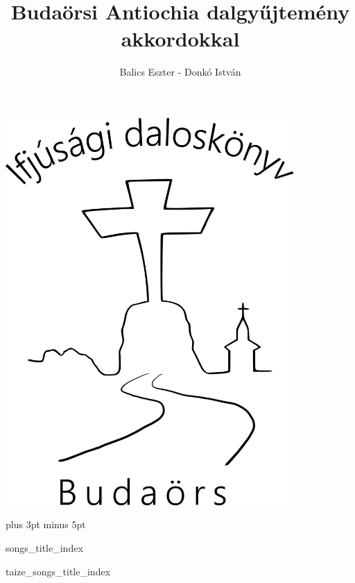 \documentclass[a5paper,twoside]{article}
\title{Budaörsi Antiochia dalgyűjtemény akkordokkal}
\author{Balics Eszter - Donkó István}
\renewcommand{\_}[1]{\underline{#1}} %
\begin{document}
  \begin{titlepage}
    \setlength{\oddsidemargin}{-1.3cm}

    \vspace*{1.3cm}
    \includegraphics[width=11cm]{Logo_songbook}

    \thispagestyle{empty}
  \end{titlepage}

  \renewcommand{\idxtitlefont}{\sffamily}
  \renewcommand{\idxlyricfont}{\rmfamily\slshape}

  \versesep=12pt plus 3pt minus 5pt

  \begin{songs}{songs_title_index}
    
  \end{songs}

  \renewcommand{\thesongnum}{T\arabic{songnum}}
  \begin{songs}{taize_songs_title_index}
    
  \end{songs}

  \renewcommand{\thesongnum}{K\arabic{songnum}}
  \begin{songs}{}
    
  \end{songs}
\end{document}

